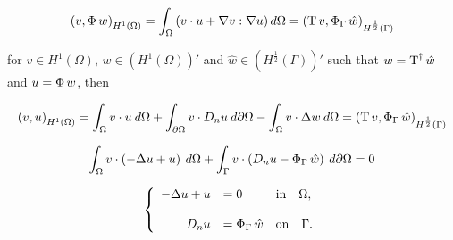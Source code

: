 $$\left( v, \operatorname{\Phi} w \right)_{H^1(\Omega)} = \int_{\Omega} \left( v \cdot u + \nabla v : \nabla u\right) d \Omega = \left( \operatorname{T} v, \operatorname{\Phi}_\Gamma \hat{w} \right)_{H^\frac12(\Gamma)} $$

for $v \in H^1(\Omega)$, $w \in (H^1(\Omega))'$ and $\hat{w}\in (H^\frac12(\Gamma))'$ such that $w = \operatorname{T}^\dagger \hat{w}$ and $u = \operatorname{\Phi} w$, then

$$\left( v, u\right)_{H^1(\Omega)} = \int_{\Omega} v \cdot u \: d \Omega +\int_{\partial \Omega} v \cdot D_n u \: d\partial\Omega - \int_{\Omega} v \cdot \Delta w \: d \Omega = \left(\operatorname{T} v, \operatorname{\Phi}_\Gamma\hat{w}\right)_{H^\frac12 (\Gamma)}$$

$$\int_{\Omega} v \cdot \left(-\Delta u + u \right) \: d \Omega +
\int_{\Gamma} v \cdot \left(D_n u -\operatorname{\Phi}_\Gamma\hat{w}\right)\: d\partial\Omega = 0 $$

$$
\left\lbrace
\begin{array}{rll}
	-\Delta u + u           & = 0       & \textrm{in} \quad \Omega,\\
	\\
	D_n u & = \operatorname{\Phi}_\Gamma \hat{w} & \textrm{on} \quad \Gamma.
\end{array} 	
\right. 
$$